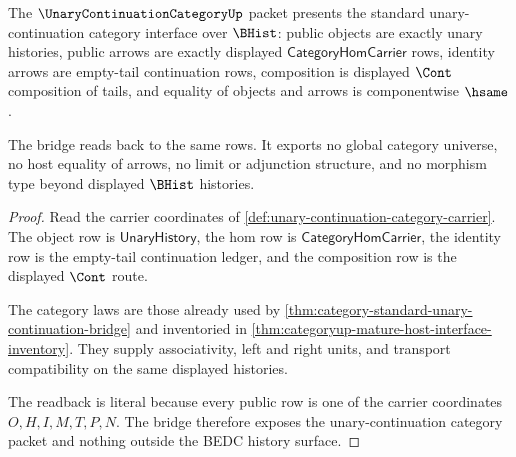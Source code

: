 \begin{theorem}
\label{thm:unary-continuation-category-standard-bridge}
The $\UnaryContinuationCategoryUp$ packet presents the standard unary-continuation category interface over $\BHist$: public objects are exactly unary histories, public arrows are exactly displayed $\mathsf{CategoryHomCarrier}$ rows, identity arrows are empty-tail continuation rows, composition is displayed $\Cont$ composition of tails, and equality of objects and arrows is componentwise $\hsame$.

The bridge reads back to the same rows. It exports no global category universe, no host equality of arrows, no limit or adjunction structure, and no morphism type beyond displayed $\BHist$ histories.
\end{theorem}
\begin{proof}
Read the carrier coordinates of \autoref{def:unary-continuation-category-carrier}. The object row is $\mathsf{UnaryHistory}$, the hom row is $\mathsf{CategoryHomCarrier}$, the identity row is the empty-tail continuation ledger, and the composition row is the displayed $\Cont$ route.

The category laws are those already used by \autoref{thm:category-standard-unary-continuation-bridge} and inventoried in \autoref{thm:categoryup-mature-host-interface-inventory}. They supply associativity, left and right units, and transport compatibility on the same displayed histories.

The readback is literal because every public row is one of the carrier coordinates $O,H,I,M,T,P,N$. The bridge therefore exposes the unary-continuation category packet and nothing outside the BEDC history surface.
\end{proof}


\begin{closurestatus}{\UnaryContinuationCategoryUp}
  \theoryclosure{\seedClosure}
  \formalstatus{\unformalizedV}
\end{closurestatus}
